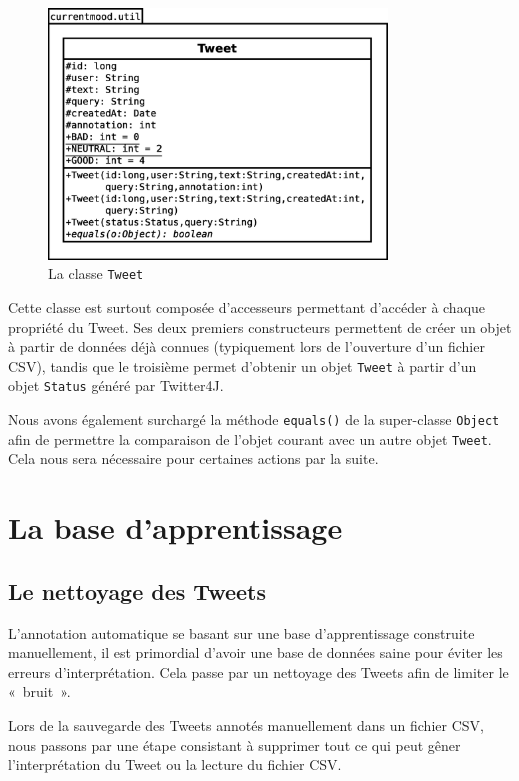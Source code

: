 \documentclass[12pt,a4paper]{report}
\begin{document}
\begin{figure}
	\centering
	\includegraphics[width=9cm]{img/uml_tweet.eps}
	\caption{La classe \texttt{Tweet}}
\label{uml_Tweet}
\end{figure}

Cette classe est surtout composée d'accesseurs permettant d'accéder à chaque
propriété du Tweet. Ses deux premiers constructeurs permettent de créer un objet
à partir de données déjà connues (typiquement lors de l'ouverture d'un fichier
CSV), tandis que le troisième permet d'obtenir un objet \texttt{Tweet} à partir
d'un objet \texttt{Status} généré par Twitter4J.

Nous avons également surchargé la méthode \texttt{equals()} de la super-classe
\texttt{Object} afin de permettre la comparaison de l'objet courant avec un
autre objet \texttt{Tweet}. Cela nous sera nécessaire pour certaines actions par
la suite.

\chapter{La base d'apprentissage}

\section{Le nettoyage des Tweets}

L'annotation automatique se basant sur une base d'apprentissage construite
manuellement, il est primordial d'avoir une base de données saine pour éviter
les erreurs d'interprétation. Cela passe par un nettoyage des Tweets afin de
limiter le «~bruit~».

Lors de la sauvegarde des Tweets annotés manuellement dans un fichier CSV, nous
passons par une étape consistant à supprimer tout ce qui peut gêner
l'interprétation du Tweet ou la lecture du fichier CSV.\@
\end{document}
